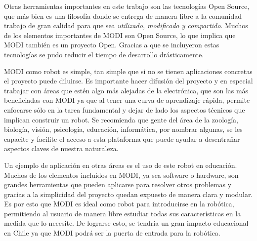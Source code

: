 Otras herramientas importantes en este trabajo son las tecnologías Open Source, que más bien es una filosofía donde se entrega de manera libre a la comunidad trabajo de gran calidad para que sea \textit{utilizado, modificado y compartido}. Muchos de los elementos importantes de MODI son Open Source, lo que implica que MODI también es un proyecto Open. Gracias a que se incluyeron estas tecnologías se pudo reducir el tiempo de desarrollo drásticamente.

MODI como robot es simple, tan simple que si no se tienen aplicaciones concretas el proyecto puede diluirse. Es importante hacer difusión del proyecto y en especial trabajar con áreas que estén algo más alejadas de la electrónica, que son las más beneficiadas con MODI ya que al tener una curva de aprendizaje rápida, permite enfocarse sólo en la tarea fundamental y dejar de lado los aspectos técnicos que implican construir un robot. Se recomienda que gente del área de la zoología, biología, visión, psicología, educación, informática, por nombrar algunas, se les capacite y facilite el acceso a esta plataforma que puede ayudar a desentrañar aspectos claves de nuestra naturaleza.

Un ejemplo de aplicación en otras áreas es el uso de este robot en educación. Muchos de los elementos incluidos en MODI, ya sea software o hardware, son grandes herramientas que pueden aplicarse para resolver otros problemas y gracias a la simplicidad del proyecto quedan expuesto de manera clara y modular. Es por esto que MODI es ideal como robot para introducirse en la robótica, permitiendo al usuario de manera libre estudiar todas sus características en la medida que lo necesite. De lograrse esto, se tendría un gran impacto educacional en Chile ya que MODI podrá ser la puerta de entrada para la robótica.